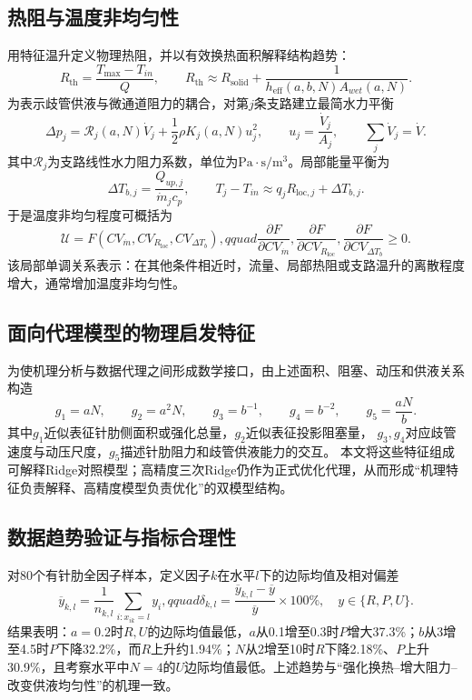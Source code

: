 \documentclass[UTF8,12pt,a4paper]{ctexart}
\newcommand{\Rth}{R_{\mathrm{th}}}
\begin{document}
\subsection{热阻与温度非均匀性}
用特征温升定义物理热阻，并以有效换热面积解释结构趋势：
\begin{equation}
\Rth=\frac{T_{\max}-T_{in}}{Q},\qquad
\Rth\approx R_{\mathrm{solid}}+\frac{1}{h_{\mathrm{eff}}(a,b,N)A_{wet}(a,N)}.
\end{equation}
为表示歧管供液与微通道阻力的耦合，对第$j$条支路建立最简水力平衡
\begin{equation}
\Delta p_j=\mathcal R_j(a,N)\dot V_j+\frac{1}{2}\rho K_j(a,N)u_j^2,\qquad
u_j=\frac{\dot V_j}{A_j},\qquad\sum_j\dot V_j=\dot V.
\end{equation}
其中$\mathcal R_j$为支路线性水力阻力系数，单位为$\mathrm{Pa\cdot s/m^3}$。局部能量平衡为
\begin{equation}
\Delta T_{b,j}=\frac{Q_{up,j}}{\dot m_jc_p},\qquad
T_j-T_{in}\approx q_jR_{\mathrm{loc},j}+\Delta T_{b,j}.
\end{equation}
于是温度非均匀程度可概括为
\begin{equation}
\mathcal U=F\!\left(CV_{\dot m},CV_{R_{\mathrm{loc}}},CV_{\Delta T_b}\right),qquad
\frac{\partial F}{\partial CV_{\dot m}},
\frac{\partial F}{\partial CV_{R_{\mathrm{loc}}}},
\frac{\partial F}{\partial CV_{\Delta T_b}}\ge0.
\end{equation}
该局部单调关系表示：在其他条件相近时，流量、局部热阻或支路温升的离散程度增大，通常增加温度非均匀性。

\subsection{面向代理模型的物理启发特征}
为使机理分析与数据代理之间形成数学接口，由上述面积、阻塞、动压和供液关系构造
\begin{equation}
g_1=aN,\qquad g_2=a^2N,\qquad g_3=b^{-1},\qquad
g_4=b^{-2},\qquad g_5=\frac{aN}{b}.
\end{equation}
其中$g_1$近似表征针肋侧面积或强化总量，$g_2$近似表征投影阻塞量，
$g_3,g_4$对应歧管速度与动压尺度，$g_5$描述针肋阻力和歧管供液能力的交互。
本文将这些特征组成可解释Ridge对照模型；高精度三次Ridge仍作为正式优化代理，从而形成“机理特征负责解释、高精度模型负责优化”的双模型结构。

\subsection{数据趋势验证与指标合理性}
对80个有针肋全因子样本，定义因子$k$在水平$l$下的边际均值及相对偏差
\begin{equation}
\overline y_{k,l}=\frac{1}{n_{k,l}}\sum_{i:x_{ik}=l}y_i,qquad
\delta_{k,l}=\frac{\overline y_{k,l}-\overline y}{\overline y}\times100\%,
\quad y\in\{R,P,U\}.
\end{equation}
结果表明：$a=0.2$时$R,U$的边际均值最低，$a$从0.1增至0.3时$P$增大37.3\%；$b$从3增至4.5时$P$下降32.2\%，而$R$上升约1.94\%；$N$从2增至10时$R$下降2.18\%、$P$上升30.9\%，且考察水平中$N=4$的$U$边际均值最低。上述趋势与“强化换热--增大阻力--改变供液均匀性”的机理一致。
\end{document}
